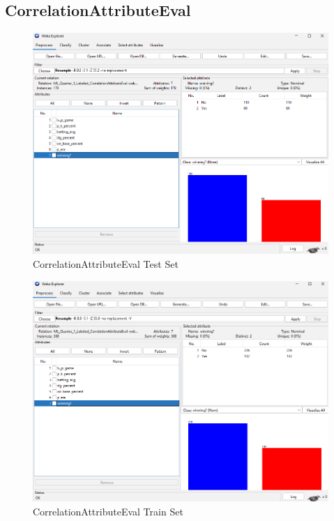 \documentclass[12pt]{article}
\begin{document}
\newpage
\subsection{CorrelationAttributeEval}
\begin{figure}[h!]
    \includegraphics[scale=0.4]{./images/CorrelationAttributeEval/TestSet.png}
\centering
    \caption{CorrelationAttributeEval Test Set}
    \label{fig:CAETest}
\end{figure}
\begin{figure}[h!]
   \includegraphics[scale=0.4]{./images/CorrelationAttributeEval/TrainSet.png}
\centering
    \caption{CorrelationAttributeEval Train Set}
    \label{fig:CAETrain}
\end{figure}
\end{document}
